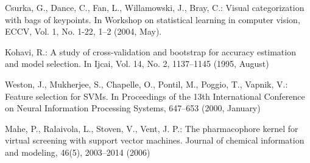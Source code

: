 \documentclass{llncs}
\begin{document}
\begin{thebibliography}{16}
Csurka, G., Dance, C., Fan, L., Willamowski, J., Bray, C.: 
Visual categorization with bags of keypoints. 
In Workshop on statistical learning in computer vision, ECCV, Vol. 1, No. 1-22, 1--2 (2004, May). 

Kohavi, R.:
A study of cross-validation and bootstrap for accuracy estimation and model selection. 
In Ijcai, Vol. 14, No. 2, 1137--1145 (1995, August)

Weston, J., Mukherjee, S., Chapelle, O., Pontil, M., Poggio, T., Vapnik, V.:
Feature selection for SVMs. 
In Proceedings of the 13th International Conference on Neural Information Processing Systems, 647--653 (2000, January)

Mahe, P., Ralaivola, L., Stoven, V., Vent, J. P.:
The pharmacophore kernel for virtual screening with support vector machines. 
Journal of chemical information and modeling, 46(5), 2003--2014 (2006)

\end{thebibliography}
\end{document}
